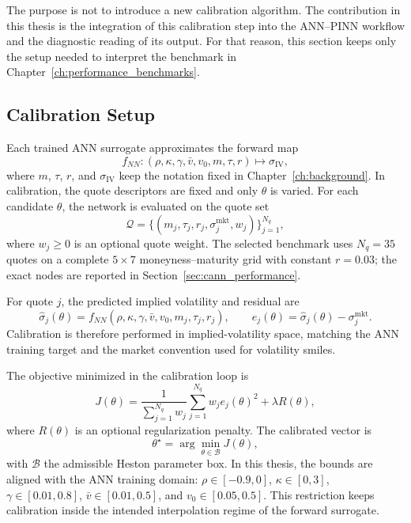 The purpose is not to introduce a new calibration algorithm. The contribution in this thesis is the integration of this calibration step into the ANN--PINN workflow and the diagnostic reading of its output. For that reason, this section keeps only the setup needed to interpret the benchmark in Chapter~\ref{ch:performance_benchmarks}.

\subsection{Calibration Setup}
\label{sec:cann_setup}

Each trained ANN surrogate approximates the forward map
\[
f_{NN}:(\rho,\kappa,\gamma,\bar v,v_0,m,\tau,r)\mapsto \sigma_{\mathrm{IV}},
\]
where \(m\), \(\tau\), \(r\), and \(\sigma_{\mathrm{IV}}\) keep the notation fixed in Chapter~\ref{ch:background}. In calibration, the quote descriptors are fixed and only \(\theta\) is varied. For each candidate \(\theta\), the network is evaluated on the quote set
\[
\mathcal{Q}=\{(m_j,\tau_j,r_j,\sigma^{\mathrm{mkt}}_j,w_j)\}_{j=1}^{N_q},
\]
where \(w_j\geq0\) is an optional quote weight. The selected benchmark uses \(N_q=35\) quotes on a complete \(5\times7\) moneyness--maturity grid with constant \(r=0.03\); the exact nodes are reported in Section~\ref{sec:cann_performance}.

For quote \(j\), the predicted implied volatility and residual are
\[
\hat\sigma_j(\theta)=f_{NN}(\rho,\kappa,\gamma,\bar v,v_0,m_j,\tau_j,r_j),
\qquad
e_j(\theta)=\hat\sigma_j(\theta)-\sigma^{\mathrm{mkt}}_j.
\]
Calibration is therefore performed in implied-volatility space, matching the ANN training target and the market convention used for volatility smiles.

The objective minimized in the calibration loop is
\begin{equation}
\label{eq:cann_objective}
J(\theta)
=
\frac{1}{\sum_{j=1}^{N_q} w_j}
\sum_{j=1}^{N_q} w_j e_j(\theta)^2
+\lambda R(\theta),
\end{equation}
where \(R(\theta)\) is an optional regularization penalty. The calibrated vector is
\begin{equation}
\label{eq:cann_argmin}
\theta^\star
=
\arg\min_{\theta\in\mathcal{B}}J(\theta),
\end{equation}
with \(\mathcal{B}\) the admissible Heston parameter box. In this thesis, the bounds are aligned with the ANN training domain: \(\rho\in[-0.9,0]\), \(\kappa\in[0,3]\), \(\gamma\in[0.01,0.8]\), \(\bar v\in[0.01,0.5]\), and \(v_0\in[0.05,0.5]\). This restriction keeps calibration inside the intended interpolation regime of the forward surrogate.

